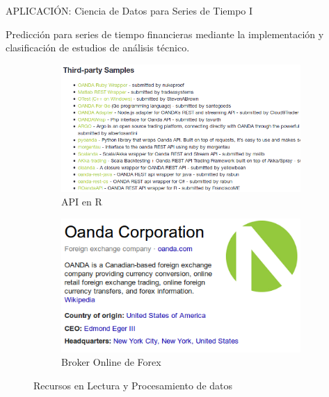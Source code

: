\documentclass{bredelebeamer}
\begin{document}

\begin{frame}{APLICACI\'ON: Ciencia de Datos para Series de Tiempo I}

Predicci\'on para series de tiempo financieras mediante la implementaci\'on y
clasificaci\'on de estudios de an\'alisis t\'ecnico.

\vspace{.05cm}

\begin{figure}
\centering
\begin{subfigure}{.5\textwidth}
  \centering
  \includegraphics[width=.95\linewidth]{images/ROanda.png}
  \caption{API en R}
\end{subfigure}%
\begin{subfigure}{.5\textwidth}
  \centering
  \includegraphics[width=.9\linewidth]{images/ROanda1.png}
  \caption{Broker Online de Forex}
\end{subfigure}

\vspace{.75cm}

\caption{Recursos en Lectura y Procesamiento de datos}
\end{figure}

\end{frame}
\end{document}
